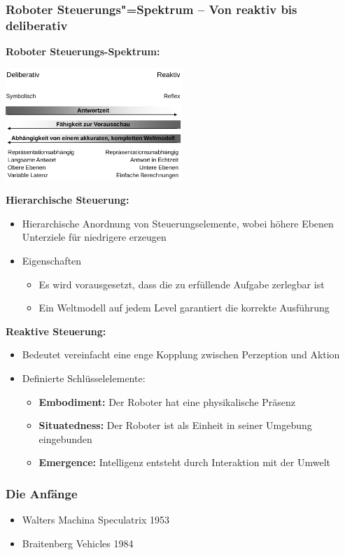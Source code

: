 \subsubsection{Roboter Steuerungs"=Spektrum -- Von reaktiv bis deliberativ}
\textbf{Roboter Steuerungs-Spektrum:}
\begin{center}
	\includegraphics[width=0.5\textwidth]{figures/steuerungs_spektrum.png}
\end{center}

\textbf{Hierarchische Steuerung:}
\begin{itemize}
	\item Hierarchische Anordnung von Steuerungselemente, wobei höhere Ebenen Unterziele für niedrigere erzeugen
	\item Eigenschaften
	\begin{itemize}
		\item Es wird vorausgesetzt, dass die zu erfüllende Aufgabe zerlegbar ist
		\item Ein Weltmodell auf jedem Level garantiert die korrekte Ausführung
	\end{itemize}
\end{itemize}

\textbf{Reaktive Steuerung:}
\begin{itemize}
	\item Bedeutet vereinfacht eine enge Kopplung zwischen Perzeption und Aktion
	\item Definierte Schlüsselelemente:
	\begin{itemize}
		\item \textbf{Embodiment:} Der Roboter hat eine physikalische Präsenz
		\item \textbf{Situatedness:} Der Roboter ist als Einheit in seiner Umgebung eingebunden
		\item \textbf{Emergence:} Intelligenz entsteht durch Interaktion mit der Umwelt
	\end{itemize}
\end{itemize}

\subsubsection{Die Anfänge}
\begin{itemize}
	\item Walters Machina Speculatrix 1953
	\item Braitenberg Vehicles 1984
\end{itemize}

